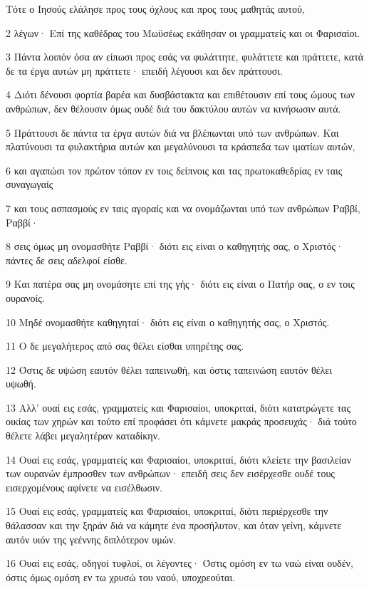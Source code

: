 \par Τότε ο Ιησούς ελάλησε προς τους όχλους και προς τους μαθητάς αυτού,
\par 2 λέγων· Επί της καθέδρας του Μωϋσέως εκάθησαν οι γραμματείς και οι Φαρισαίοι.
\par 3 Πάντα λοιπόν όσα αν είπωσι προς εσάς να φυλάττητε, φυλάττετε και πράττετε, κατά δε τα έργα αυτών μη πράττετε· επειδή λέγουσι και δεν πράττουσι.
\par 4 Διότι δένουσι φορτία βαρέα και δυσβάστακτα και επιθέτουσιν επί τους ώμους των ανθρώπων, δεν θέλουσιν όμως ουδέ διά του δακτύλου αυτών να κινήσωσιν αυτά.
\par 5 Πράττουσι δε πάντα τα έργα αυτών διά να βλέπωνται υπό των ανθρώπων. Και πλατύνουσι τα φυλακτήρια αυτών και μεγαλύνουσι τα κράσπεδα των ιματίων αυτών,
\par 6 και αγαπώσι τον πρώτον τόπον εν τοις δείπνοις και τας πρωτοκαθεδρίας εν ταις συναγωγαίς
\par 7 και τους ασπασμούς εν ταις αγοραίς και να ονομάζωνται υπό των ανθρώπων Ραββί, Ραββί·
\par 8 σεις όμως μη ονομασθήτε Ραββί· διότι εις είναι ο καθηγητής σας, ο Χριστός· πάντες δε σεις αδελφοί είσθε.
\par 9 Και πατέρα σας μη ονομάσητε επί της γής· διότι εις είναι ο Πατήρ σας, ο εν τοις ουρανοίς.
\par 10 Μηδέ ονομασθήτε καθηγηταί· διότι εις είναι ο καθηγητής σας, ο Χριστός.
\par 11 Ο δε μεγαλήτερος από σας θέλει είσθαι υπηρέτης σας.
\par 12 Όστις δε υψώση εαυτόν θέλει ταπεινωθή, και όστις ταπεινώση εαυτόν θέλει υψωθή.
\par 13 Αλλ' ουαί εις εσάς, γραμματείς και Φαρισαίοι, υποκριταί, διότι κατατρώγετε τας οικίας των χηρών και τούτο επί προφάσει ότι κάμνετε μακράς προσευχάς· διά τούτο θέλετε λάβει μεγαλητέραν καταδίκην.
\par 14 Ουαί εις εσάς, γραμματείς και Φαρισαίοι, υποκριταί, διότι κλείετε την βασιλείαν των ουρανών έμπροσθεν των ανθρώπων· επειδή σεις δεν εισέρχεσθε ουδέ τους εισερχομένους αφίνετε να εισέλθωσιν.
\par 15 Ουαί εις εσάς, γραμματείς και Φαρισαίοι, υποκριταί, διότι περιέρχεσθε την θάλασσαν και την ξηράν διά να κάμητε ένα προσήλυτον, και όταν γείνη, κάμνετε αυτόν υιόν της γεέννης διπλότερον υμών.
\par 16 Ουαί εις εσάς, οδηγοί τυφλοί, οι λέγοντες· Όστις ομόση εν τω ναώ είναι ουδέν, όστις όμως ομόση εν τω χρυσώ του ναού, υποχρεούται.
